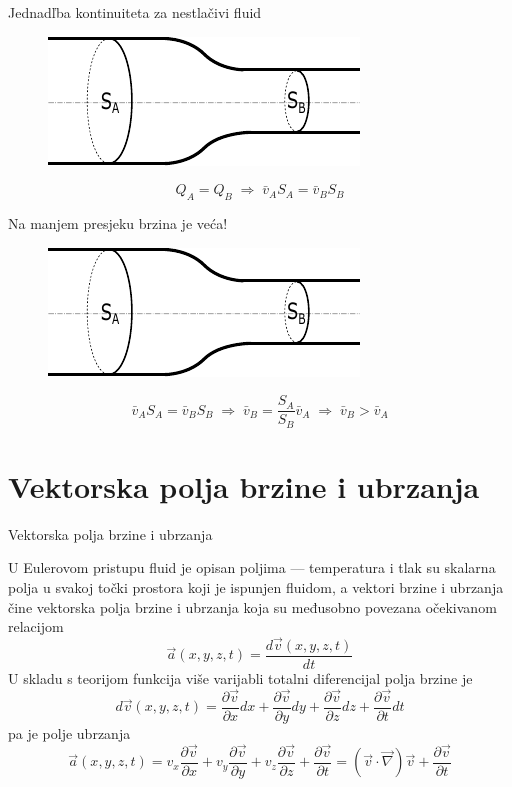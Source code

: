 \documentclass[croatian]{beamer}
\begin{document}
\begin{frame}{Jednadľba kontinuiteta za nestlačivi fluid}

\begin{figure}
\includegraphics[scale=1.35]{figs/jdba-kont-cijev}
\end{figure}
\[
Q_{A}=Q_{B}\;\Rightarrow\;\bar{v}_{A}S_{A}=\bar{v}_{B}S_{B}
\]
\end{frame}

\begin{frame}{Na manjem presjeku brzina je veća!}

\begin{figure}
\includegraphics[scale=1.35]{figs/jdba-kont-cijev}
\end{figure}
 \[
\bar{v}_{A}S_{A}=\bar{v}_{B}S_{B}\;\Rightarrow\;\bar{v}_{B}=\frac{S_{A}}{S_{B}}\bar{v}_{A}\;\Rightarrow\;\bar{v}_{B}>\bar{v}_{A}
\]
\end{frame}


\section{Vektorska polja brzine i ubrzanja}

\begin{frame}{Vektorska polja brzine i ubrzanja}

U Eulerovom pristupu fluid je opisan poljima --- temperatura i tlak
su skalarna polja u svakoj točki prostora koji je ispunjen fluidom,
a vektori brzine i ubrzanja čine vektorska polja brzine i ubrzanja
koja su međusobno povezana očekivanom relacijom
\[
\vec{a}(x,y,z,t)=\frac{d\vec{v}(x,y,z,t)}{dt}
\]
U skladu s teorijom funkcija više varijabli totalni diferencijal polja
brzine je
\[
d\vec{v}(x,y,z,t)=\frac{\partial\vec{v}}{\partial x}dx+\frac{\partial\vec{v}}{\partial y}dy+\frac{\partial\vec{v}}{\partial z}dz+\frac{\partial\vec{v}}{\partial t}dt
\]
pa je polje ubrzanja
\[
\vec{a}(x,y,z,t)=v_{x}\frac{\partial\vec{v}}{\partial x}+v_{y}\frac{\partial\vec{v}}{\partial y}+v_{z}\frac{\partial\vec{v}}{\partial z}+\frac{\partial\vec{v}}{\partial t}=(\vec{v}\cdot\vec{\nabla})\vec{v}+\frac{\partial\vec{v}}{\partial t}
\]
\end{frame}
\end{document}
